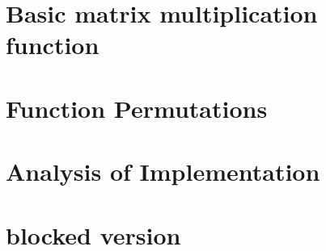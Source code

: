 \documentclass[12pt, twoside,a4paper]{report}
\begin{document}
\chapter{Basic matrix multiplication function}


\chapter{Function Permutations}


\chapter{Analysis of Implementation}


\chapter{blocked version}


%


\end{document}
